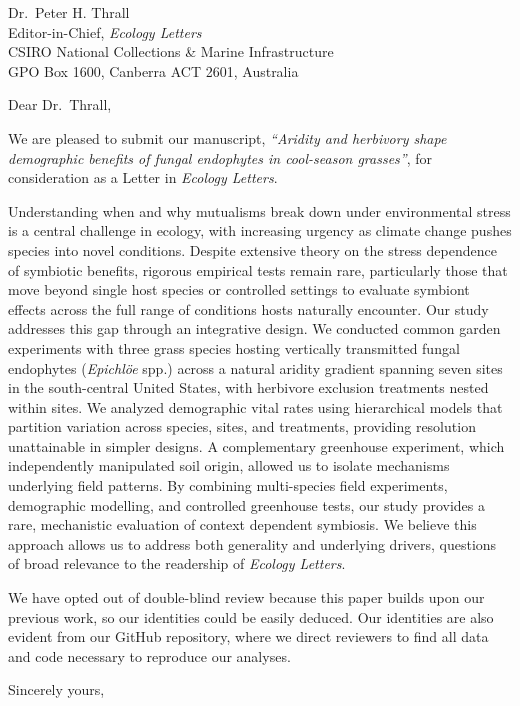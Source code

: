 \documentclass[12pt]{letter}
\date{\today}
\begin{document}
\begin{letter}{%
  Dr.\ Peter H. Thrall\\
  Editor-in-Chief, \textit{Ecology Letters}\\
  CSIRO National Collections \& Marine Infrastructure\\
  GPO Box 1600, Canberra ACT 2601, Australia
}

\opening{Dear Dr.\ Thrall,}

We are pleased to submit our manuscript, \textit{``Aridity and herbivory shape demographic benefits of fungal endophytes in cool-season grasses''}, for consideration as a Letter in \textit{Ecology Letters}.

Understanding when and why mutualisms break down under environmental stress is a central challenge in ecology, with increasing urgency as climate change pushes species into novel conditions. Despite extensive theory on the stress dependence of symbiotic benefits, rigorous empirical tests remain rare, particularly those that move beyond single host species or controlled settings to evaluate symbiont effects across the full range of conditions hosts naturally encounter.
Our study addresses this gap through an integrative design. We conducted common garden experiments with three grass species hosting vertically transmitted fungal endophytes (\textit{Epichlöe} spp.) across a natural aridity gradient spanning seven sites in the south-central United States, with herbivore exclusion treatments nested within sites. We analyzed demographic vital rates using hierarchical models that partition variation across species, sites, and treatments, providing resolution unattainable in simpler designs. A complementary greenhouse experiment, which independently manipulated soil origin, allowed us to isolate mechanisms underlying field patterns.
By combining multi-species field experiments, demographic modelling, and controlled greenhouse tests, our study provides a rare, mechanistic evaluation of context dependent symbiosis. We believe this approach allows us to address both generality and underlying drivers, questions of broad relevance to the readership of \textit{Ecology Letters}.

We have opted out of double-blind review because this paper builds upon our previous work, so our identities could be easily deduced. Our identities are also evident from our GitHub repository, where we direct reviewers to find all data and code necessary to reproduce our analyses.


\closing{Sincerely yours,}

\end{letter}
\end{document}
